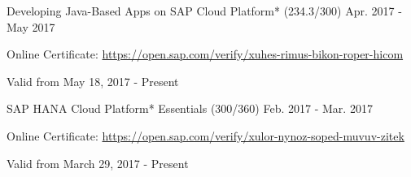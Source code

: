 \begin{cventries}
	  
  \cventry
    {Developing Java-Based Apps on SAP Cloud Platform* (234.3/300)} %
    {} %
    {} %
    {Apr. 2017 - May 2017} %
    {
	    \begin{cvitems} %
        \item {Online Certificate: \url{https://open.sap.com/verify/xuhes-rimus-bikon-roper-hicom}} %
        \item {Valid from May 18, 2017 - Present} %
      \end{cvitems}
    }    

  \cventry
    {SAP HANA Cloud Platform* Essentials (300/360)} %
    {} %
    {} %
    {Feb. 2017 - Mar. 2017} %
    {
	    \begin{cvitems} %
        \item {Online Certificate: \url{https://open.sap.com/verify/xulor-nynoz-soped-muvuv-zitek}} %
        \item {Valid from March 29, 2017 - Present} %
      \end{cvitems}
    }        
    

\end{cventries}

